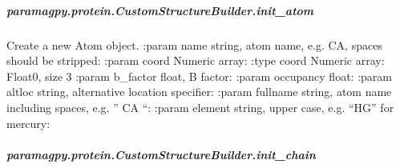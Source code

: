 \documentclass[a4paper,10pt,english,openany,oneside]{sphinxmanual}
\begin{document}
\begin{fulllineitems}
\begin{fulllineitems}
\begin{fulllineitems}
\end{fulllineitems}



\subparagraph{paramagpy.protein.CustomStructureBuilder.init\_atom}
\label{\detokenize{reference/generated/paramagpy.protein.CustomStructureBuilder.init_atom:paramagpy-protein-customstructurebuilder-init-atom}}\label{\detokenize{reference/generated/paramagpy.protein.CustomStructureBuilder.init_atom::doc}}

\begin{fulllineitems}
\label{\detokenize{reference/generated/paramagpy.protein.CustomStructureBuilder.init_atom:paramagpy.protein.CustomStructureBuilder.init_atom}}
\sphinxAtStartPar
Create a new Atom object.
:param \sphinxhyphen{} name \sphinxhyphen{} string, atom name, e.g. CA, spaces should be stripped:
:param \sphinxhyphen{} coord \sphinxhyphen{} Numeric array:
:type \sphinxhyphen{} coord \sphinxhyphen{} Numeric array: Float0, size 3
:param \sphinxhyphen{} b\_factor \sphinxhyphen{} float, B factor:
:param \sphinxhyphen{} occupancy \sphinxhyphen{} float:
:param \sphinxhyphen{} altloc \sphinxhyphen{} string, alternative location specifier:
:param \sphinxhyphen{} fullname \sphinxhyphen{} string, atom name including spaces, e.g. ” CA “:
:param \sphinxhyphen{} element \sphinxhyphen{} string, upper case, e.g. “HG” for mercury:

\end{fulllineitems}



\subparagraph{paramagpy.protein.CustomStructureBuilder.init\_chain}
\label{\detokenize{reference/generated/paramagpy.protein.CustomStructureBuilder.init_chain:paramagpy-protein-customstructurebuilder-init-chain}}\label{\detokenize{reference/generated/paramagpy.protein.CustomStructureBuilder.init_chain::doc}}


\end{fulllineitems}
\end{fulllineitems}
\end{document}
